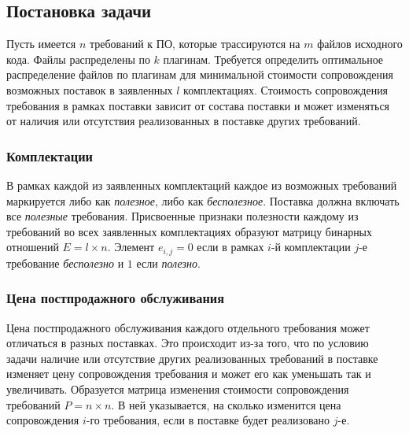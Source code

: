 

\subsection*{Постановка задачи}
Пусть имеется $n$ требований к ПО, которые трассируются на $m$ файлов исходного кода. Файлы распределены по $k$ плагинам. Требуется определить оптимальное распределение файлов по плагинам для минимальной стоимости сопровождения возможных поставок в заявленных $l$ комплектациях. Стоимость сопровождения требования в рамках поставки зависит от состава поставки и может изменяться от наличия или отсутствия реализованных в поставке других требований.

\subsubsection*{Комплектации}
В рамках каждой из заявленных комплектаций каждое из возможных требований маркируется либо как \textit{полезное}, либо как \textit{бесполезное}. Поставка должна включать все \textit{полезные} требования. Присвоенные признаки полезности каждому из требований во всех заявленных комплектациях образуют матрицу бинарных отношений $E = l \times n$. Элемент $e_{i, j} = 0$ если в рамках $i$-й комплектации $j$-е требование \textit{бесполезно} и $1$ если \textit{полезно}.

\subsubsection*{Цена постпродажного обслуживания}
Цена постпродажного обслуживания каждого отдельного требования может отличаться в разных поставках. Это происходит из-за того, что по условию задачи наличие или отсутствие других реализованных требований в поставке изменяет цену сопровождения требования и может его как уменьшать так и увеличивать. Образуется матрица изменения стоимости сопровождения требований $P = n \times n$. В ней указывается, на сколько изменится цена сопровождения $i$-го требования, если в поставке будет реализовано $j$-е.

